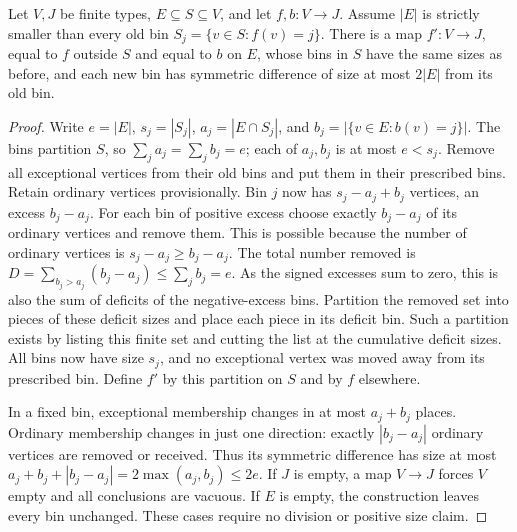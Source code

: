 \begin{lemma}
Let $V,J$ be finite types, $E\subseteq S\subseteq V$, and let
$f,b:V\to J$. Assume $|E|$ is strictly smaller than every old bin
$S_j=\{v\in S:f(v)=j\}$. There is a map $f':V\to J$, equal to
$f$ outside $S$ and equal to $b$ on $E$, whose bins in $S$ have the
same sizes as before, and each new bin has symmetric difference
of size at most $2|E|$ from its old bin.
\end{lemma}
\begin{proof}
Write $e=|E|$, $s_j=|S_j|$, $a_j=|E\cap S_j|$, and
$b_j=|\{v\in E:b(v)=j\}|$. The bins partition $S$, so
$\sum_j a_j=\sum_j b_j=e$; each of $a_j,b_j$ is at most $e<s_j$.
Remove all exceptional vertices from their old bins and put them
in their prescribed bins. Retain ordinary vertices provisionally.
Bin $j$ now has $s_j-a_j+b_j$ vertices, an excess $b_j-a_j$.
For each bin of positive excess choose exactly $b_j-a_j$ of its
ordinary vertices and remove them. This is possible because the
number of ordinary vertices is $s_j-a_j\geq b_j-a_j$.
The total number removed is
$D=\sum_{b_j>a_j}(b_j-a_j)\leq\sum_j b_j=e$.
As the signed excesses sum to zero, this is also the sum of deficits
of the negative-excess bins. Partition the removed set into pieces
of these deficit sizes and place each piece in its deficit bin.
Such a partition exists by listing this finite set and cutting the
list at the cumulative deficit sizes. All bins now have size $s_j$,
and no exceptional vertex was moved away from its prescribed bin.
Define $f'$ by this partition on $S$ and by $f$ elsewhere.

In a fixed bin, exceptional membership changes in at most
$a_j+b_j$ places. Ordinary membership changes in just one direction:
exactly $|b_j-a_j|$ ordinary vertices are removed or received.
Thus its symmetric difference has size at most
$a_j+b_j+|b_j-a_j|=2\max(a_j,b_j)\leq2e$.
If $J$ is empty, a map $V\to J$ forces $V$ empty and all conclusions
are vacuous. If $E$ is empty, the construction leaves every bin
unchanged. These cases require no division or positive size claim.
\end{proof}
